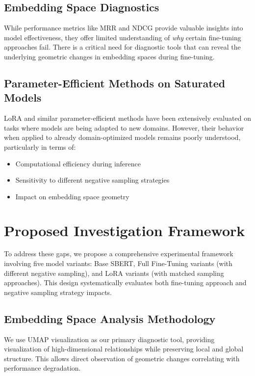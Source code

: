 \subsection{Embedding Space Diagnostics}

While performance metrics like MRR and NDCG provide valuable insights into model effectiveness, they offer limited understanding of \textit{why} certain fine-tuning approaches fail. There is a critical need for diagnostic tools that can reveal the underlying geometric changes in embedding spaces during fine-tuning.

\subsection{Parameter-Efficient Methods on Saturated Models}

LoRA and similar parameter-efficient methods have been extensively evaluated on tasks where models are being adapted to new domains. However, their behavior when applied to already domain-optimized models remains poorly understood, particularly in terms of:

\begin{itemize}
\item Computational efficiency during inference
\item Sensitivity to different negative sampling strategies
\item Impact on embedding space geometry
\end{itemize}

\section{Proposed Investigation Framework}

To address these gaps, we propose a comprehensive experimental framework involving five model variants: Base SBERT, Full Fine-Tuning variants (with different negative sampling), and LoRA variants (with matched sampling approaches). This design systematically evaluates both fine-tuning approach and negative sampling strategy impacts.

\subsection{Embedding Space Analysis Methodology}

We use UMAP visualization as our primary diagnostic tool, providing visualization of high-dimensional relationships while preserving local and global structure. This allows direct observation of geometric changes correlating with performance degradation.

